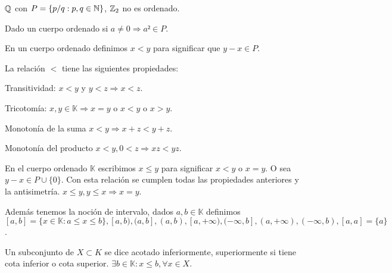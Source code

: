 \begin{eg}
    $\mathbb{Q}$ con $P = \{ p/q:p,q\in \mathbb{N} \}$, $\mathbb{Z}_2$ no es ordenado.
\end{eg}

\begin{prop}
    Dado un cuerpo ordenado si $a \neq 0 \Rightarrow a²\in P$.
\end{prop}

En un cuerpo ordenado definimos $x<y$ para significar que $y-x\in P$.

La relación $<$ tiene las siguientes propiedades:

\begin{prop}
    Transitividad: $x<y$ y $y<z \Rightarrow x<z$.
\end{prop}

\begin{prop}
    Tricotomía: $x,y \in \mathbb{K} \Rightarrow x=y$ o $x<y$ o $x>y$.
\end{prop}

\begin{prop}
    Monotonía de la suma $x<y \Rightarrow x+z<y+z$.
\end{prop}

\begin{prop}
    Monotonía del producto $x<y, 0<z \Rightarrow xz <yz$.
\end{prop}

En el cuerpo ordenado $\mathbb{K}$ escribimos $x \leq y$ para significar $x<y$ o $x=y$. O sea $y-x \in P \cup \{0\}$. Con esta relación se cumplen todas las propiedades anteriores y la antisimetría. $x \leq y, y \leq x \Rightarrow x = y$.

Además tenemos la noción de intervalo, dados $a,b \in \mathbb{K}$ definimos $[a,b ] = \{ x \in \mathbb{K} : a \leq x \leq b \}, [a, b), (a, b], (a,b), [a, +\infty), (-\infty, b], (a, +\infty), (-\infty, b), [a, a] = \{a\}$.

Un subconjunto de $X \subset K$ se dice acotado inferiormente, superiormente si tiene cota inferior o cota superior. $\exists b \in \mathbb{K}: x \leq b, \forall x \in X$.
